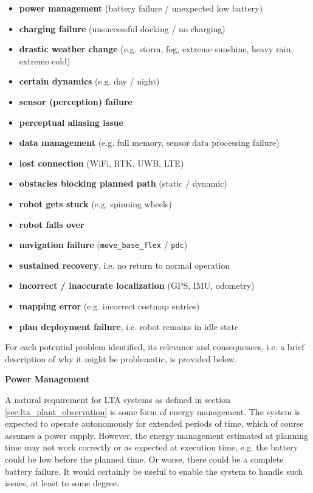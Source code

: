 \documentclass[english, master, utf8]{base/thesis_KBS}
\newcommand{\code}[1]{\colorbox{light-gray}{\texttt{#1}}}
\begin{document}
\begin{itemize}
    \item \textbf{power management} (battery failure / unexpected low battery)
    \item \textbf{charging failure} (unsuccessful docking / no charging)
    \item \textbf{drastic weather change} (e.g. storm, fog, extreme sunshine, heavy rain, extreme cold)
    \item \textbf{certain dynamics} (e.g. day / night)
    \item \textbf{sensor (perception) failure}
    \item \textbf{perceptual aliasing issue}
    \item \textbf{data management} (e.g. full memory, sensor data processing failure)
    \item \textbf{lost connection} (WiFi, RTK, UWB, LTE)
    \item \textbf{obstacles blocking planned path} (static / dynamic)
    \item \textbf{robot gets stuck} (e.g. spinning wheels)
    \item \textbf{robot falls over}
    \item \textbf{navigation failure} (\code{move\_base\_flex} / \code{pdc})
    \item \textbf{sustained recovery}, i.e. no return to normal operation
    \item \textbf{incorrect / inaccurate localization} (GPS, IMU, odometry)
    \item \textbf{mapping error} (e.g. incorrect costmap entries)
    \item \textbf{plan deployment failure}, i.e. robot remains in idle state
\end{itemize}
For each potential problem identified, its relevance and consequences, i.e. a brief description of why it might be problematic, is provided below.\newline

\noindent
\textbf{Power Management}\newline

\noindent
A natural requirement for LTA systems as defined in section \ref{sec:lta_plant_observation} is some form of energy management.
The system is expected to operate autonomously for extended periods of time, which of course assumes a power supply. 
However, the energy management estimated at planning time may not work correctly or as expected at execution time, e.g. the battery could be 
low before the planned time. Or worse, there could be a complete battery failure. It would certainly be useful to enable the system to handle such issues, at least to 
some degree.\newline
\end{document}
